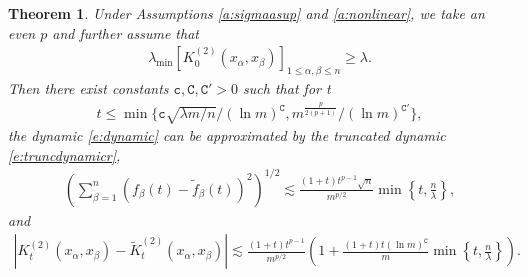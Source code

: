 \documentclass{article}
\numberwithin{equation}{section}
\newcommand{\fc}{{\mathtt c}}
\newcommand{\fC}{{\mathtt C}}
\newcommand{\al}{\alpha}
\newcommand{\la}{\lambda}
\renewcommand{\leq}{\leqslant}
\renewcommand{\geq}{\geqslant}
\newcommand{\1}{\mathds{1}}
\theoremstyle{plain} %
\newtheorem{theorem}{Theorem}[section]
\begin{document}
\begin{theorem}\label{t:main2}
Under Assumptions \ref{a:sigmaasup} and \ref{a:nonlinear}, we take an even $p$ and further assume that  
\begin{align*}
\la_{\min} \left[K_0^{(2)}(x_\al, x_\beta)\right]_{1\leq \al, \beta\leq n}\geq \la.
\end{align*}
Then there exist  constants $\fc, \fC,\fC'>0$ such that for t
\begin{align}\label{time}
t\leq \min\{\fc \sqrt{\la m/n}/(\ln m)^{\fC}, m^{\frac{p}{2(p+1)}}/(\ln m)^{\fC'}\}, 
\end{align} 
the dynamic \eqref{e:dynamic} can be approximated by the truncated dynamic \eqref{e:truncdynamicr}, 
\begin{align}\label{e:L2er}
\left(\sum_{\beta=1}^n(f_\beta(t)-\tilde f_\beta(t))^2\right)^{1/2} \lesssim \frac{(1+t)t^{p-1}\sqrt n}{m^{p/2}} \min\left\{t, \frac{n}{\la}\right\},
\end{align}
and 
\begin{align}\label{e:kerneler}
|K_t^{(2)}(x_\al,x_\beta)-\tilde K_t^{(2)}(x_\al,x_\beta)|\lesssim\frac{(1+t)t^{p-1}}{m^{p/2}}\left(1+\frac{(1+t)t(\ln m)^{\fC}}{m}\min\left\{t, \frac{n}{\la}\right\}\right).
\end{align}
\end{theorem}
\end{document}
